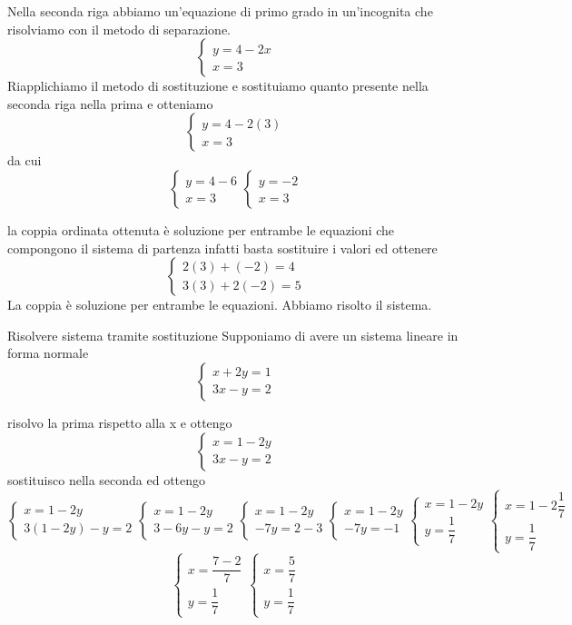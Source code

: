 Nella seconda riga abbiamo un'equazione di primo grado in un'incognita che risolviamo con il metodo di separazione.
\[ 
\begin{cases}
	y=4-2x\\
	x=3
\end{cases}\]
Riapplichiamo il metodo di sostituzione e sostituiamo quanto presente nella seconda riga nella prima e otteniamo
\[ 
\begin{cases}
y=4-2(3)\\
x=3
\end{cases}\]
da cui
\[ 
\begin{cases}
y=4-6\\
x=3
\end{cases}
\begin{cases}
y=-2\\
x=3
\end{cases}\]

la coppia ordinata ottenuta è soluzione per entrambe le equazioni che compongono il sistema di partenza infatti basta sostituire i valori ed ottenere
	\[
\begin{cases}
2(3)+(-2)=4\\
3(3)+2(-2)=5
\end{cases}
\]
La coppia è soluzione per entrambe le equazioni. Abbiamo risolto il sistema.
\begin{esempiot}{Risolvere sistema tramite sostituzione}{}
Supponiamo di avere un sistema lineare in forma normale
\[
\begin{cases}
	x+2y=1\\
	3x-y=2
\end{cases}
\]
\end{esempiot}
risolvo la prima rispetto alla x e ottengo 
\[
\begin{cases}
	x=1-2y\\
	3x-y=2
\end{cases}
\]
sostituisco nella seconda ed ottengo
\[
\begin{cases}
	x=1-2y\\
	3(1-2y)-y=2
\end{cases}
\begin{cases}
	x=1-2y\\
	3-6y-y=2
\end{cases}
\begin{cases}
	x=1-2y\\
	-7y=2-3
\end{cases}
\begin{cases}
	x=1-2y\\
	-7y=-1
\end{cases}
\begin{cases}
	x=1-2y\\
	y=\dfrac{1}{7}
\end{cases}
\begin{cases}
	x=1-2\dfrac{1}{7}\\
	y=\dfrac{1}{7}
\end{cases}
\]
\[
\begin{cases}
	x=\dfrac{7-2}{7} \\
	y=\dfrac{1}{7}
\end{cases}
\begin{cases}
	x=\dfrac{5}{7}\\
	y=\dfrac{1}{7}
\end{cases}
\]
